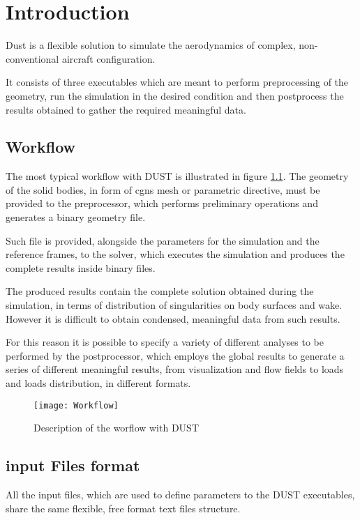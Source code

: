 \chapter{Introduction}

Dust is a flexible solution to simulate the aerodynamics of complex, 
non-conventional aircraft configuration.

It consists of three executables which are meant to perform preprocessing 
of the geometry, run the simulation in the desired condition and then postprocess 
the results obtained to gather the required meaningful data. 

\section{Workflow}
\label{sec:Workflow}

The most typical workflow with DUST is illustrated in figure \ref{fig:worflow}.  
The geometry of the solid bodies, in form of cgns mesh or parametric directive, 
must be provided to the preprocessor, which performs preliminary operations and 
generates a binary geometry file. 

Such file is provided, alongside the parameters for the simulation and the reference 
frames, to the solver, which executes the simulation and produces the complete results 
inside binary files. 

The produced results contain the complete solution obtained during the simulation, 
in terms of distribution of singularities on body surfaces and wake. However it is 
difficult to obtain condensed, meaningful data from such results.

For this reason it is possible to specify a variety of different analyses to be 
performed by the postprocessor, which employs the global results to generate a 
series of different meaningful results, from visualization and flow fields to 
loads and loads distribution, in different formats.

\begin{figure}[h]
\centering
\texttt{[image: Workflow]}
\caption{Description of the worflow with DUST}
\label{fig:worflow}
\end{figure}



\section{input Files format}
\label{sec:InputFilesFormat}
All the input files, which are used to define parameters to the DUST executables, 
share the same flexible, free format text files structure.

